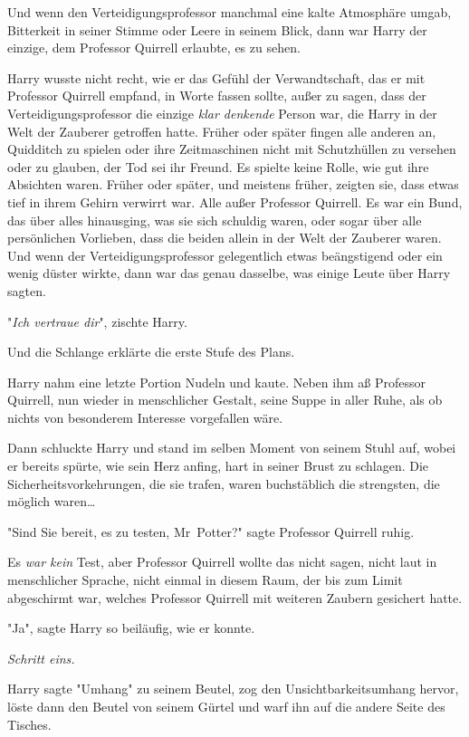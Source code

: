 {Und wenn den Verteidigungsprofessor manchmal eine kalte Atmosphäre umgab, Bitterkeit in seiner Stimme oder Leere in seinem Blick, dann war Harry der einzige, dem Professor Quirrell erlaubte, es zu sehen.

Harry wusste nicht recht, wie er das Gefühl der Verwandtschaft, das er mit Professor Quirrell empfand, in Worte fassen sollte, außer zu sagen, dass der Verteidigungsprofessor die einzige \emph{klar denkende} Person war, die Harry in der Welt der Zauberer getroffen hatte. Früher oder später fingen alle anderen an, Quidditch zu spielen oder ihre Zeitmaschinen nicht mit Schutzhüllen zu versehen oder zu glauben, der Tod sei ihr Freund. Es spielte keine Rolle, wie gut ihre Absichten waren. Früher oder später, und meistens früher, zeigten sie, dass etwas tief in ihrem Gehirn verwirrt war. Alle außer Professor Quirrell. Es war ein Bund, das über alles hinausging, was sie sich schuldig waren, oder sogar über alle persönlichen Vorlieben, dass die beiden allein in der Welt der Zauberer waren. Und wenn der Verteidigungsprofessor gelegentlich etwas beängstigend oder ein wenig düster wirkte, dann war das genau dasselbe, was einige Leute über Harry sagten.

"\emph{Ich vertraue dir}", zischte Harry.

Und die Schlange erklärte die erste Stufe des Plans.

Harry nahm eine letzte Portion Nudeln und kaute. Neben ihm aß Professor Quirrell, nun wieder in menschlicher Gestalt, seine Suppe in aller Ruhe, als ob nichts von besonderem Interesse vorgefallen wäre.

Dann schluckte Harry und stand im selben Moment von seinem Stuhl auf, wobei er bereits spürte, wie sein Herz anfing, hart in seiner Brust zu schlagen. Die Sicherheitsvorkehrungen, die sie trafen, waren buchstäblich die strengsten, die möglich waren…

"Sind Sie bereit, es zu testen, Mr~Potter?" sagte Professor Quirrell ruhig.

Es \emph{war kein} Test, aber Professor Quirrell wollte das nicht sagen, nicht laut in menschlicher Sprache, nicht einmal in diesem Raum, der bis zum Limit abgeschirmt war, welches Professor Quirrell mit weiteren Zaubern gesichert hatte.

"Ja", sagte Harry so beiläufig, wie er konnte.

\emph{Schritt eins.}

Harry sagte "Umhang" zu seinem Beutel, zog den Unsichtbarkeitsumhang hervor, löste dann den Beutel von seinem Gürtel und warf ihn auf die andere Seite des Tisches.

}
